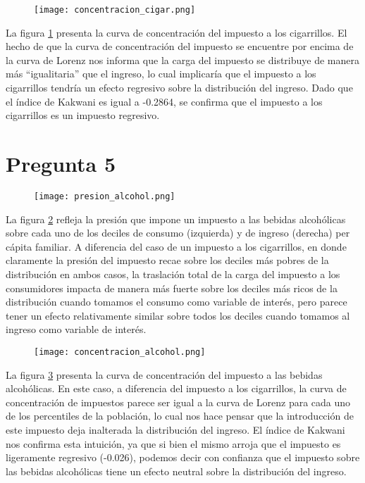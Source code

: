 \documentclass[11pt,oneside]{article}
\begin{document}
	\begin{figure}
    		\centering
    		\texttt{[image: concentracion\_cigar.png]}
    		\label{fig:4B}
	\end{figure}

	La figura \ref{fig:4B} presenta la curva de concentración del impuesto a los cigarrillos. El hecho de que la curva de concentración del impuesto se encuentre por encima de la curva de Lorenz nos informa que la carga del impuesto se distribuye de manera más ``igualitaria'' que el ingreso, lo cual implicaría que el impuesto a los cigarrillos tendría un efecto regresivo sobre la distribución del ingreso. Dado que el índice de Kakwani es igual a -0.2864, se confirma que el impuesto a los cigarrillos es un impuesto regresivo.
 
	\section*{Pregunta 5}

 	\begin{figure}
    		\centering
    		\texttt{[image: presion\_alcohol.png]}
    		\label{fig:5A}
	\end{figure}

	La figura \ref{fig:5A} refleja la presión que impone un impuesto a las bebidas alcohólicas sobre cada uno de los deciles de consumo (izquierda) y de ingreso (derecha) per cápita familiar. A diferencia del caso de un impuesto a los cigarrillos, en donde claramente la presión del impuesto recae sobre los deciles más pobres de la distribución en ambos casos, la traslación total de la carga del impuesto a los consumidores impacta de manera más fuerte sobre los deciles más ricos de la distribución cuando tomamos el consumo como variable de interés, pero parece tener un efecto relativamente similar sobre todos los deciles cuando tomamos al ingreso como variable de interés.

	\begin{figure}
    		\centering
    		\texttt{[image: concentracion\_alcohol.png]}
    		\label{fig:5B}
	\end{figure}

	La figura \ref{fig:5B} presenta la curva de concentración del impuesto a las bebidas alcohólicas. En este caso, a diferencia del impuesto a los cigarrillos, la curva de concentración de impuestos parece ser igual a la curva de Lorenz para cada uno de los percentiles de la población, lo cual nos hace pensar que la introducción de este impuesto deja inalterada la distribución del ingreso. El índice de Kakwani nos confirma esta intuición, ya que si bien el mismo arroja que el impuesto es ligeramente regresivo (-0.026), podemos decir con confianza que el impuesto sobre las bebidas alcohólicas tiene un efecto neutral sobre la distribución del ingreso.
 
\end{document}
